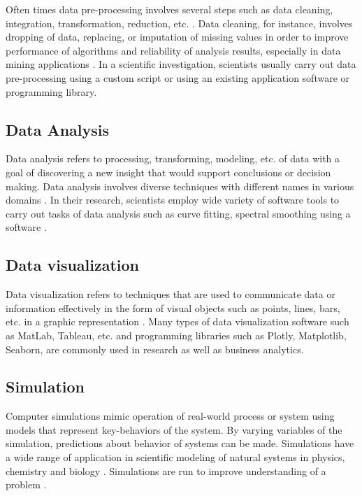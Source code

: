 Often times data pre-processing involves several steps such as data cleaning, integration, transformation, reduction, etc. \citep{malley2016data}. Data cleaning, for instance, involves dropping of data, replacing, or imputation of missing values in order to improve performance of algorithms and reliability of analysis results, especially in data mining applications \citep{enwiki:1051181443, enwiki:1056727993}. In a scientific investigation, scientists usually carry out data pre-processing using a custom script or using an existing application software or programming library. \\

\subsection{Data Analysis}
\label{sec:purpose:Types:Analysis}

Data analysis refers to processing, transforming, modeling, etc. of data with a goal of discovering a new insight that would support conclusions or decision making. Data analysis involves diverse techniques with different names in various domains \citep{enwiki:1061024140}. In their research, scientists employ wide variety of software tools to carry out tasks of data analysis such as  curve fitting, spectral smoothing using a software \citep{proctor1982data}. 

\subsection{Data visualization}
\label{sec:purpose:Types:visualization}

Data visualization refers to techniques that are used to communicate data or information effectively in the form of visual objects such as points, lines, bars, etc. in a graphic representation \citep{enwiki:1059912747}. Many types of data visualization software such as MatLab, Tableau, etc. and programming libraries such as Plotly, Matplotlib, Seaborn, are commonly used in research as well as business analytics. 

\subsection{Simulation}
\label{sec:purpose:Types:Simulation}

Computer simulations mimic operation of real-world process or system using models that represent key-behaviors of the system. By varying variables of the simulation, predictions about behavior of systems can be made. Simulations have a wide range of application in scientific modeling of natural systems in physics, chemistry and biology \citep{enwiki:1061669086}. Simulations are run to improve understanding of a problem  \citep{segal2008developing}.


